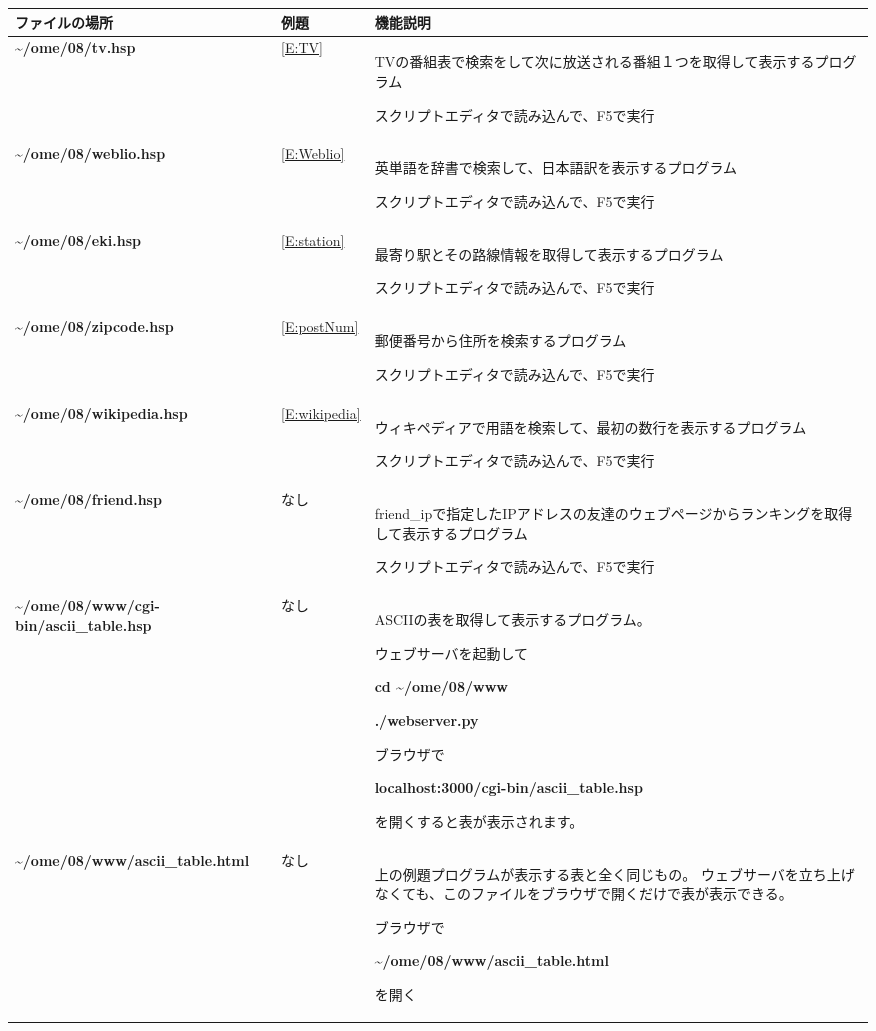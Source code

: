\documentclass[a4paper,12pt,dvipdfmx]{jarticle}
\begin{document}
\begin{flushleft}
\tablefirsthead{}
\tablehead{}
\tabletail{}
\tablelasttail{}
\begin{supertabular}{|m{6.7730002cm}|m{2.042cm}|m{7.5810003cm}|}
\hline
ファイルの場所 &
例題 &
機能説明\\\hline
	\textbf{\~{}/ome/08/tv.hsp} &
\ref*{E:TV} &
TVの番組表で検索をして次に放送される番組１つを取得して表示するプログラム

スクリプトエディタで読み込んで、F5で実行\\\hline
	\textbf{\~{}/ome/08/weblio.hsp} &
\ref*{E:Weblio} &
英単語を辞書で検索して、日本語訳を表示するプログラム

スクリプトエディタで読み込んで、F5で実行\\\hline
	\textbf{\~{}/ome/08/eki.hsp} &
\ref*{E:station} &
最寄り駅とその路線情報を取得して表示するプログラム

スクリプトエディタで読み込んで、F5で実行\\\hline
	\textbf{\~{}/ome/08/zipcode.hsp} &
\ref*{E:postNum} &
郵便番号から住所を検索するプログラム

スクリプトエディタで読み込んで、F5で実行\\\hline
	\textbf{\~{}/ome/08/wikipedia.hsp} &
\ref*{E:wikipedia} &
ウィキペディアで用語を検索して、最初の数行を表示するプログラム

スクリプトエディタで読み込んで、F5で実行\\\hline
	\textbf{\~{}/ome/08/friend.hsp} &
なし &
friend\_ipで指定したIPアドレスの友達のウェブページからランキングを取得して表示するプログラム

スクリプトエディタで読み込んで、F5で実行\\\hline
	\textbf{\~{}/ome/08/www/cgi-bin/ascii\_table.hsp} &
なし &
ASCIIの表を取得して表示するプログラム。

ウェブサーバを起動して

	\textbf{cd \~{}/ome/08/www}

	\textbf{./webserver.py}

ブラウザで

	\textbf{localhost:3000/cgi-bin/ascii\_table.hsp}

を開くすると表が表示されます。\\\hline
	\textbf{\~{}/ome/08/www/ascii\_table.html} &
なし &
上の例題プログラムが表示する表と全く同じもの。
	ウェブサーバを立ち上げなくても、このファイルをブラウザで開くだけで表が表示できる。

ブラウザで

	\textbf{\~{}/ome/08/www/ascii\_table.html}

を開く\\\hline
\end{supertabular}
\end{flushleft}
\end{document}
